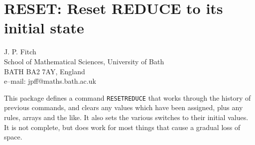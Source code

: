 \chapter{RESET: Reset REDUCE to its initial state}
\label{RESET}

{\footnotesize
\begin{center}
J. P. Fitch \\
School of Mathematical Sciences, University of Bath\\
BATH BA2 7AY, England \\[0.05in]
e--mail: jpff@maths.bath.ac.uk
\end{center}
}

This package defines a command {\tt RESETREDUCE}
 that works through the history of previous
commands, and clears any values which have been assigned, plus any
rules, arrays and the like.  It also sets the various switches to
their initial values.  It is not complete, but does work for most
things that cause a gradual loss of space.

